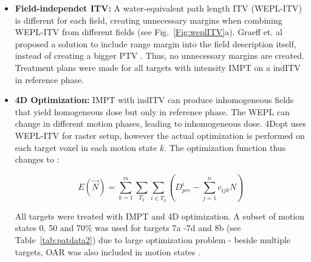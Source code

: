 \documentclass[type=dr, dr=rernat, accentcolor=tud7b,colorbacktitle, bigchapter, openright, twoside, 12pt ]{tudthesis}
\begin{document}
\begin{itemize}
\item \textbf{Field-independet ITV:} A water-equivalent path length ITV (WEPL-ITV) is different for each field, creating unnecessary margins when combining WEPL-ITV from different fields (see Fig.~\ref{Fig:weplITV}a). 
Graeff et. al proposed a solution to include range margin into the field description itself, instead of creating a bigger PTV \cite{Graeff2012}. 
Thus, no unnecessary margins are created. Treatment plans were made for all targets with intensity IMPT on a indITV in reference phase.

\item \textbf{4D Optimization:} IMPT with indITV can produce inhomogeneous fields that yield homogeneous dose but only in reference phase. The WEPL can change in different motion phases, leading to inhomogeneous dose.
4Dopt uses WEPL-ITV for raster setup, however the actual optimization is performed on each target voxel in each motion state $k$. The optimization function thus changes to \cite{Graeff2012}:

\begin{equation}
\label{eq-multiCost}
E(\vec{N}) = \sum_{k=1}^{m}\sum_{T_k} \sum_{i\in T_k} \left( D_{pre}^{i} -\sum_{j=1}^n c_{ijk}N\right)
\end{equation}

All targets were treated with IMPT and 4D optimization. A subset of motion states 0, 50 and 70\% was used for targets 7a -7d and 8b (see Table~\ref{tab:patdata2}) due to large optimization problem - beside multiple targets, 
OAR was also included in motion states \cite{Graeff2012}.

\end{itemize}
\end{document}
